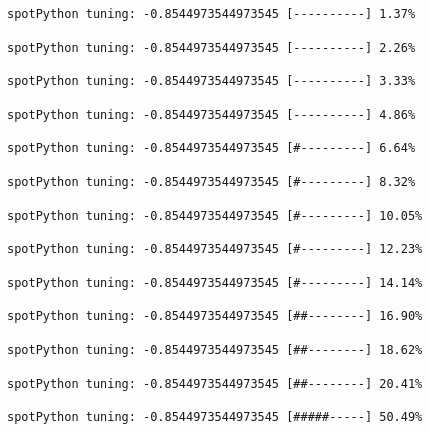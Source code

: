 \documentclass[
  letterpaper,
  DIV=11,
  numbers=noendperiod]{scrreprt}
\begin{document}
\begin{verbatim}
spotPython tuning: -0.8544973544973545 [----------] 1.37% 
\end{verbatim}

\begin{verbatim}
spotPython tuning: -0.8544973544973545 [----------] 2.26% 
\end{verbatim}

\begin{verbatim}
spotPython tuning: -0.8544973544973545 [----------] 3.33% 
\end{verbatim}

\begin{verbatim}
spotPython tuning: -0.8544973544973545 [----------] 4.86% 
\end{verbatim}

\begin{verbatim}
spotPython tuning: -0.8544973544973545 [#---------] 6.64% 
\end{verbatim}

\begin{verbatim}
spotPython tuning: -0.8544973544973545 [#---------] 8.32% 
\end{verbatim}

\begin{verbatim}
spotPython tuning: -0.8544973544973545 [#---------] 10.05% 
\end{verbatim}

\begin{verbatim}
spotPython tuning: -0.8544973544973545 [#---------] 12.23% 
\end{verbatim}

\begin{verbatim}
spotPython tuning: -0.8544973544973545 [#---------] 14.14% 
\end{verbatim}

\begin{verbatim}
spotPython tuning: -0.8544973544973545 [##--------] 16.90% 
\end{verbatim}

\begin{verbatim}
spotPython tuning: -0.8544973544973545 [##--------] 18.62% 
\end{verbatim}

\begin{verbatim}
spotPython tuning: -0.8544973544973545 [##--------] 20.41% 
\end{verbatim}

\begin{verbatim}
spotPython tuning: -0.8544973544973545 [#####-----] 50.49% 
\end{verbatim}
\end{document}
